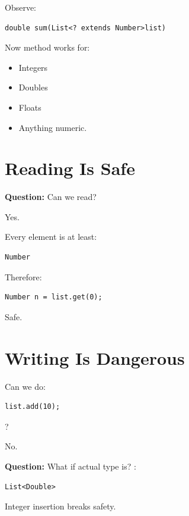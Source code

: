 \documentclass[11pt,a4paper]{book}
\newcommand{\question}[1]{
\vspace{0.5em}
\textbf{Question:} #1?
\vspace{0.2em}
}
\begin{document}
Observe:

\begin{verbatim} 
double sum(List<? extends Number>list)
\end{verbatim}

Now method works for:
\begin{itemize}
\item [ > ]Integers
\item [ > ]Doubles
\item [ > ]Floats
\item [ > ]Anything numeric.
\end{itemize}

\section{Reading Is Safe}

\question{Can we read}

\textcolor{RosettaDeepGreen}{Yes}.

Every element is at least:

\begin{verbatim} 
Number
\end{verbatim}

Therefore:

\begin{verbatim} 
Number n = list.get(0);
\end{verbatim}

Safe.

\section{Writing Is Dangerous}

Can we do:

\begin{verbatim} 
list.add(10);
\end{verbatim}

?

\textcolor{RosettaRed}{No}.

\question{What if actual type is}:

\begin{verbatim} 
List<Double>
\end{verbatim}

Integer insertion breaks safety.

\end{document}
